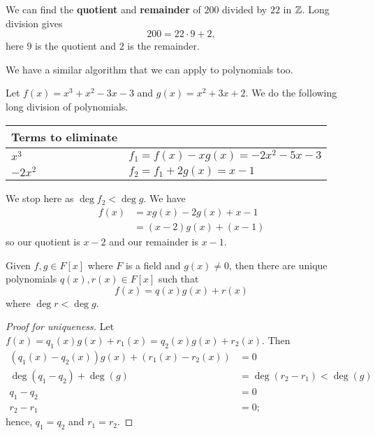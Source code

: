 \begin{example}
    We can find the \textbf{quotient} and \textbf{remainder} of $200$ divided by $22$ in $\mathbb{Z}$. Long division gives
    \[ 200 = 22 \cdot 9 + 2, \]
    here $9$ is the quotient and $2$ is the remainder.
\end{example}

We have a similar algorithm that we can apply to polynomials too.

\begin{example}
    Let $f(x) = x^3 + x^2 - 3x - 3$ and $g(x) = x^2 + 3x + 2$. We do the following long division of polynomials.
    \begin{center}
        \begin{tabular}{ll}
            \toprule
            Terms to eliminate & \\
            \midrule
            $x^3$   & $f_1 = f(x) - xg(x) = -2x^2 - 5x - 3$ \\
            $-2x^2$ & $f_2 = f_1 + 2g(x) = x - 1$           \\
            \bottomrule
        \end{tabular}
    \end{center}
    We stop here as $\deg f_2 < \deg g$. We have
    \begin{align*}
        f(x) &= xg(x) - 2g(x) + x - 1 \\
             &= (x - 2)g(x) + (x - 1)
    \end{align*}
    so our quotient is $x-2$ and our remainder is $x - 1$.
\end{example}

\begin{proposition}
    Given $f, g \in F[x]$ where $F$ is a field and $g(x) \neq 0$, then there are unique polynomials $q(x), r(x) \in F[x]$ such that
    \[ f(x) = q(x) g(x) + r(x) \]
    where $\deg r < \deg g$.
\end{proposition}

\begin{proof}[Proof for uniqueness]
    Let $f(x) = q_1(x)g(x) + r_1(x) = q_2(x) g(x) + r_2(x)$. Then
    \begin{align*}
        (q_1(x) - q_2(x))g(x) + (r_1(x) - r_2(x)) &= 0                         \\
        \deg(q_1 - q_2) + \deg(g)                 &= \deg(r_2 - r_1) < \deg(g) \\
        q_1 - q_2                                 &= 0                         \\  
        r_2 - r_1                                 &= 0;
    \end{align*}
    hence, $q_1 = q_2$ and $r_1 = r_2$.
\end{proof}
